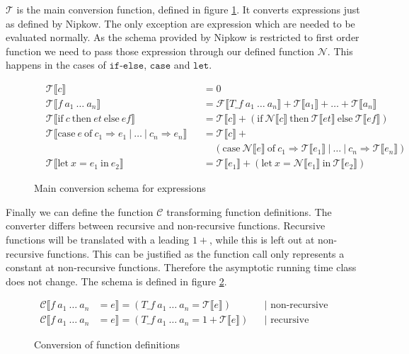 $\mathcal{T}$ is the main conversion function, defined in figure \ref{fig:schema_T}.
It converts expressions just as defined by Nipkow.
The only exception are expression which are needed to be evaluated normally.
As the schema provided by Nipkow is restricted to first order function we need to pass those expression through our defined function $\mathcal{N}$.
This happens in the cases of $\texttt{if-else}$, $\texttt{case}$ and $\texttt{let}$.
\begin{figure}
\begin{align*}
  &\mathcal{T}\llbracket c\rrbracket &&= 0\\
  &\mathcal{T}\llbracket f\ a_{1}\ \dots\ a_{n}\rrbracket &&= \mathcal{F}\llbracket T\_f\ a_{1}\ \dots\ a_{n}\rrbracket + \mathcal{T}\llbracket a_{1}\rrbracket + \dots + \mathcal{T}\llbracket a_{n}\rrbracket\\
  &\mathcal{T}\llbracket \text{if}\ c\ \text{then}\ et\ \text{else}\ ef\rrbracket &&= \mathcal{T}\llbracket c\rrbracket + (\text{if}\ \mathcal{N}\llbracket c\rrbracket\ \text{then}\ \mathcal{T}\llbracket et\rrbracket\ \text{else}\ \mathcal{T}\llbracket ef\rrbracket)\\
  &\mathcal{T}\llbracket \text{case}\ e\ \text{of}\ c_{1} \Rightarrow e_{1}\ |\ \dots\ |\ c_{n}\Rightarrow e_{n}\rrbracket &&= \mathcal{T}\llbracket c\rrbracket + \\
  & &&\ \ \ \ \ (\text{case}\ \mathcal{N}\llbracket e\rrbracket\ \text{of}\ c_{1}\Rightarrow\mathcal{T}\llbracket e_{1}\rrbracket\ |\ \dots\ |\ c_{n} \Rightarrow \mathcal{T}\llbracket e_{n}\rrbracket)\\
  &\mathcal{T}\llbracket \text{let}\ x = e_{1}\ \text{in}\ e_{2}\rrbracket &&= \mathcal{T}\llbracket e_{1}\rrbracket + (\text{let}\ x = \mathcal{N}\llbracket e_{1}\rrbracket\ \text{in}\ \mathcal{T}\llbracket e_{2}\rrbracket)
\end{align*}
  \caption{Main conversion schema for expressions}
  \label{fig:schema_T}
\end{figure}

Finally we can define the function $\mathcal{C}$ transforming function definitions.
The converter differs between recursive and non-recursive functions.
Recursive functions will be translated with a leading $1+$, while this is left out at non-recursive functions.
This can be justified as the function call only represents a constant at non-recursive functions.
Therefore the asymptotic running time class does not change.
The schema is defined in figure \ref{fig:schema_C}.

\begin{figure}
  \begin{align*}
    \mathcal{C}\llbracket f\ a_1\ \dots\ a_n &= e\rrbracket = (T\_f\ a_{1}\ \dots\ a_{n} = \mathcal{T}\llbracket e\rrbracket) &&\text{| non-recursive}\\
    \mathcal{C}\llbracket f\ a_1\ \dots\ a_n &= e\rrbracket = (T\_f\ a_{1}\ \dots\ a_{n} = 1 + \mathcal{T}\llbracket e\rrbracket) &&\text{| recursive}
  \end{align*}
  \caption{Conversion of function definitions}
  \label{fig:schema_C}
\end{figure}
